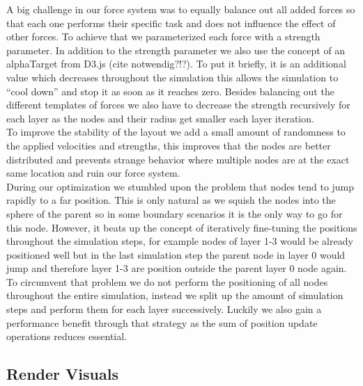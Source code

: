A big challenge in our force system was to equally balance out all added forces so that each one performs their specific task and does not influence the effect of other forces. To achieve that we parameterized each force with a strength parameter.
In addition to the strength parameter we also use the concept of an alphaTarget from D3.js (cite notwendig?!?). To put it briefly, it is an additional value which decreases throughout the simulation this allows the simulation to “cool down” and stop it as soon as it reaches zero. Besides balancing out the different templates of forces we also have to decrease the strength recursively for each layer as the nodes and their radius get smaller each layer iteration.\\
To improve the stability of the layout we add a small amount of randomness to the applied velocities and strengths, this improves that the nodes are better distributed and prevents strange behavior where multiple nodes are at the exact same location and ruin our force system.\\
During our optimization we stumbled upon the problem that nodes tend to jump rapidly to a far position. This is only natural as we squish the nodes into the sphere of the parent so in some boundary scenarios it is the only way to go for this node. However, it beats up the concept of iteratively fine-tuning the positions throughout the simulation steps, for example nodes of layer 1-3 would be already positioned well but in the last simulation step the parent node in layer 0 would jump and therefore layer 1-3 are position outside the parent layer 0 node again. To circumvent that problem we do not perform the positioning of all nodes throughout the entire simulation, instead we split up the amount of simulation steps and perform them for each layer successively. Luckily we also gain a performance benefit through that strategy as the sum of position update operations reduces essential.
\subsection{Render Visuals}

